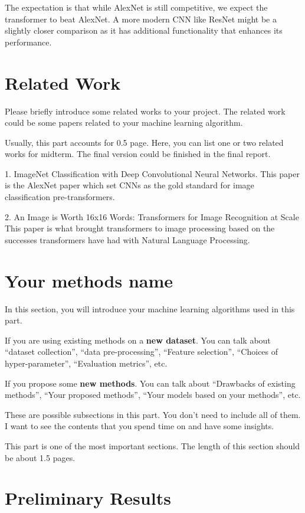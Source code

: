\documentclass[11pt]{article}
\begin{document}
The expectation is that while AlexNet is still competitive, we expect the transformer to beat AlexNet. A more modern CNN like ResNet might be a slightly closer comparison as it has additional
functionality that enhances its performance.

\section{Related Work}

Please briefly introduce some related works to your project. The
related work could be some papers related to your machine
learning algorithm.

Usually, this part accounts for 0.5 page. Here, you can list one
or two related works for midterm. The final version could be
finished in the final report.

1. ImageNet Classification with Deep Convolutional Neural Networks.
This paper is the AlexNet paper which set CNNs as the gold standard for image classification pre-transformers.

2. An Image is Worth 16x16 Words: Transformers for Image Recognition at Scale
This paper is what brought transformers to image processing based on the successes transformers have had with Natural Language Processing.

\section{Your methods name}

In this section, you will introduce your machine learning
algorithms used in this part.

If you are using existing methods on a \textbf{new dataset}. You
can talk about ``dataset collection'', ``data pre-processing'',
``Feature selection'', ``Choices of hyper-parameter'',
``Evaluation metrics'', etc.

If you propose some \textbf{new methods}. You can talk about
``Drawbacks of existing methods'', ``Your proposed methods'',
``Your models based on your methods'', etc.

These are possible subsections in this part. You don't need to
include all of them. I want to see the contents that you spend
time on and have some insights.

This part is one of the most important sections. The length of this
section should be about 1.5 pages.

\section{Preliminary Results}
\end{document}
